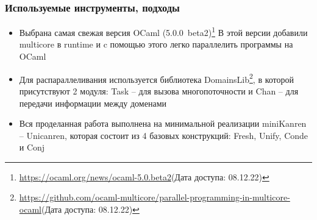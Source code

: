 \documentclass[aspectratio=169]{beamer}
\begin{document}




\begin{frame}
	\frametitle{Используемые инструменты, подходы}
	\begin{itemize}
		\item Выбрана самая свежая версия OCaml (5.0.0~beta2)\footnote{\url{https://ocaml.org/news/ocaml-5.0.beta2}(Дата доступа: 08.12.22)}
		      В этой версии добавили multicore в runtime и
		      c помощью этого легко параллелить программы на OCaml
		\item Для распараллеливания используется библиотека DomainsLib\footnote{\url{https://github.com/ocaml-multicore/parallel-programming-in-multicore-ocaml}(Дата доступа: 08.12.22)},
		      в которой присутствуют 2 модуля: Task -- для вызова многопоточности и Chan -- для передачи информации между доменами
		\item Вся проделанная работа выполнена на минимальной реализации miniKanren -- Unicanren, которая состоит из 4 базовых конструкций: Fresh, Unify, Conde и Conj
	\end{itemize}
\end{frame}
\end{document}
